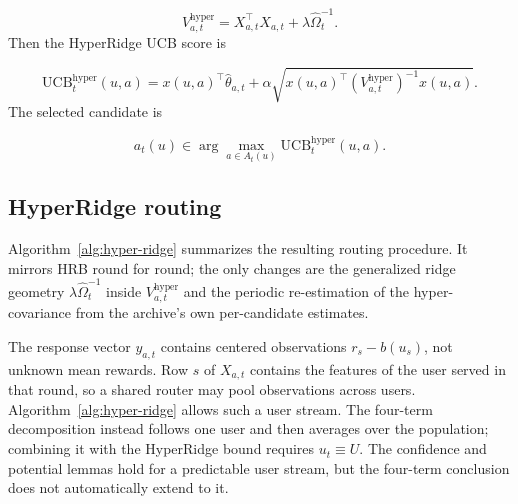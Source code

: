 \documentclass{article} %
\begin{document}
\begin{equation}
\label{eq:hyper-design}
V_{a,t}^{\mathrm{hyper}} = X_{a,t}^\top X_{a,t} + \lambda \widehat{\Omega}_t^{-1}.
\end{equation}
Then the HyperRidge UCB score is

\begin{equation}
\label{eq:hyper-ucb}
\mathrm{UCB}_t^{\mathrm{hyper}}(u, a)
= x(u, a)^\top \widehat{\theta}_{a,t}
+ \alpha \sqrt{ x(u, a)^\top \left( V_{a,t}^{\mathrm{hyper}} \right)^{-1} x(u, a) }.
\end{equation}
The selected candidate is

\begin{equation}
a_t(u) \in \arg\max_{a \in A_t(u)} \mathrm{UCB}_t^{\mathrm{hyper}}(u, a).
\end{equation}
\subsection{HyperRidge routing}

\label{sec:method-alg}

Algorithm~\ref{alg:hyper-ridge} summarizes the resulting routing procedure.
It mirrors HRB round for round; the only changes are
the generalized ridge geometry $\lambda \widehat{\Omega}_t^{-1}$ inside
$V_{a,t}^{\mathrm{hyper}}$ and the periodic re-estimation of the
hyper-covariance from the archive's own per-candidate estimates.

The response vector $y_{a,t}$ contains centered observations $r_s-b(u_s)$, not unknown mean rewards. Row $s$ of $X_{a,t}$ contains the features of the user served in that round, so a shared router may pool observations across users. Algorithm~\ref{alg:hyper-ridge} allows such a user stream. The four-term decomposition instead follows one user and then averages over the population; combining it with the HyperRidge bound requires $u_t\equiv U$. The confidence and potential lemmas hold for a predictable user stream, but the four-term conclusion does not automatically extend to it.
\end{document}
